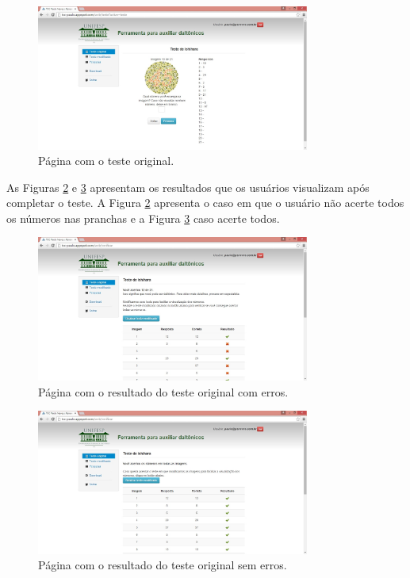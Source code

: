 \documentclass[	12pt, Times, openright, twoside, a4paper, english, brazil]{abntex2}
\begin{document}
\begin{figure}[!htb]
\centering \includegraphics[width=0.8\textwidth]{telaTesteOriginal.jpg}
\caption{Página com o teste original.} \label{fig:telaTesteOriginal}
\end{figure}

As Figuras \ref{fig:telaResultadoOriginalErro} e \ref{fig:telaResultadoOriginal} apresentam os resultados que os usuários visualizam após completar o teste. A Figura \ref{fig:telaResultadoOriginalErro} apresenta o caso em que o usuário não acerte todos os números nas pranchas e a Figura \ref{fig:telaResultadoOriginal} caso acerte todos.

\begin{figure}[!htb]
\centering \includegraphics[width=0.8\textwidth]{telaResultadoOriginalErro.jpg}
\caption{Página com o resultado do teste original com erros.} \label{fig:telaResultadoOriginalErro}
\end{figure}

\begin{figure}[!htb]
\centering \includegraphics[width=0.8\textwidth]{telaResultadoOriginal.jpg}
\caption{Página com o resultado do teste original sem erros.} \label{fig:telaResultadoOriginal}
\end{figure}
\end{document}
